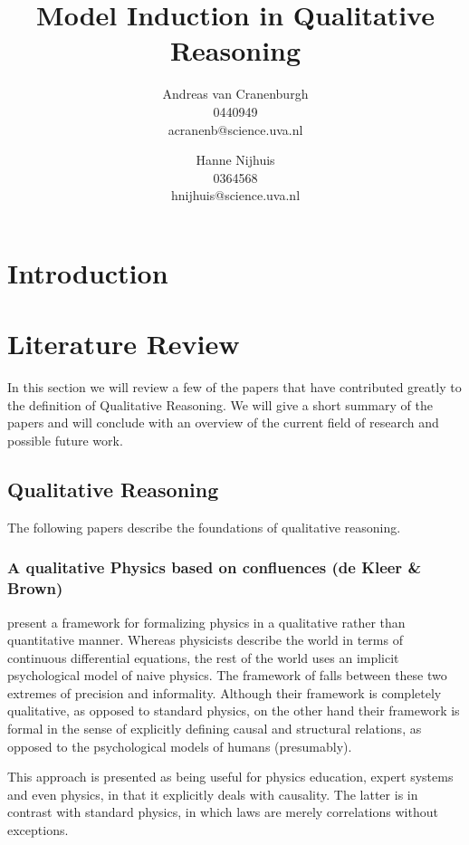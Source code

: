 \documentclass{article}
\title{Model Induction in Qualitative Reasoning}
\author{Andreas van Cranenburgh \\ 0440949 \\ acranenb@science.uva.nl 
\and Hanne Nijhuis \\ 0364568 \\ hnijhuis@science.uva.nl}
\begin{document}
\maketitle

\begin{abstract}
\end{abstract}

\section{Introduction}

\section{Literature Review}
In this section we will review a few of the papers that have contributed
greatly to the definition of Qualitative Reasoning. We will give a short
summary of the papers and will conclude with an overview of the current field
of research and possible future work.

\subsection{Qualitative Reasoning}
The following papers describe the foundations of qualitative reasoning.

\subsubsection{A qualitative Physics based on confluences (de Kleer \& Brown)}

\cite{kleer} present a framework for formalizing physics in a qualitative
rather than quantitative manner. Whereas physicists describe the world in terms
of continuous differential equations, the rest of the world uses an implicit
psychological model of naive physics. The framework of \cite{kleer} falls between
these two extremes of precision and informality. Although their framework is completely
qualitative, as opposed to standard physics, on the other hand their framework
is formal in the sense of explicitly defining causal and structural relations, as opposed
to the psychological models of humans (presumably).

This approach is presented as being useful for physics education, expert
systems and even physics, in that it explicitly deals with causality. The
latter is in contrast with standard physics, in which laws are merely
correlations without exceptions.
\end{document}
